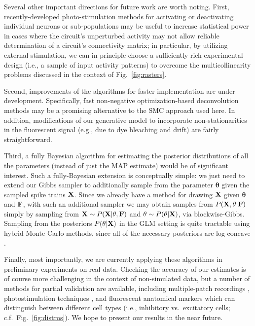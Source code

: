 \documentclass[aoas,preprint]{imsart}
\newcommand{\bth}{\mathbf{\theta}}
\newcommand{\bF}{{\bf F}}
\newcommand{\bX}{{\bf X}}
\begin{document}
Several other important directions for future work are worth noting.
First, recently-developed photo-stimulation methods for activating or
deactivating individual neurons or sub-populations
\cite{Deisseroth05,SzobotaIsacoff07,Nikolenko08} may be useful to
increase statistical power in cases where the circuit's unperturbed
activity may not allow reliable determination of a circuit's
connectivity matrix; in particular, by utilizing external stimulation,
we can in principle choose a sufficiently rich experimental design
(i.e., a sample of input activity patterns) to overcome the
multicollinearity problems discussed in the context of
Fig.~\ref{fig:rasters}.

Second, improvements of the algorithms for faster implementation are
under development.  Specifically, fast non-negative optimization-based
deconvolution methods may be a promising alternative
\cite{Vogelstein08,Pan08b} to the SMC approach used here.  In
addition, modifications of our generative model to incorporate
non-stationarities in the fluorescent signal (e.g., due to dye
bleaching and drift) are fairly straightforward.

Third, a fully Bayesian algorithm for estimating the posterior
distributions of all the parameters (instead of just the MAP estimate)
would be of significant interest.  Such a fully-Bayesian extension is
conceptually simple: we just need to extend our Gibbs sampler to
additionally sample from the parameter $\bth$ given the sampled spike
trains $\bX$. Since we already have a method for drawing $\bX$ given
$\bth$ and $\bF$, with such an additional sampler we may obtain
samples from $P(\bX,\bth | \bF)$ simply by sampling from $\bX \sim
P(\bX|\theta,\bF)$ and $\bth \sim P(\bth |\bX)$, via blockwise-Gibbs.
Sampling from the posteriors $P(\bth|\bX)$ in the GLM setting is quite
tractable using hybrid Monte Carlo methods, since all of the necessary
posteriors are log-concave
\cite{Ishwaran99,Gamerman97,Gamerman98,Yashar08}.

Finally, most importantly, we are currently applying these algorithms
in preliminary experiments on real data.  Checking the accuracy of our
estimates is of course more challenging in the context of
non-simulated data, but a number of methods for partial validation are
available, including multiple-patch recordings \cite{Song2005},
photostimulation techniques \cite{Vovan07}, and fluorescent anatomical
markers which can distinguish between different cell types
\cite{Meyer02} (i.e., inhibitory vs.\ excitatory cells; c.f.\
Fig.~\ref{fig:distros}).  We hope to present our results in the near
future.
\end{document}
